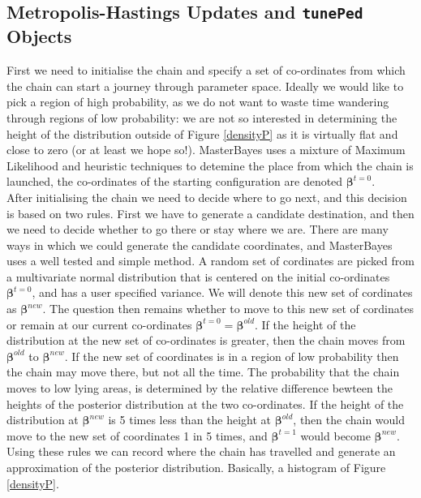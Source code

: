 \documentclass{article}
\begin{document}
\subsection{Metropolis-Hastings Updates and \texttt{tunePed} Objects}

First we need to initialise the chain and specify a set of co-ordinates from which the chain can start a journey through parameter space. Ideally we would like to pick a region of high probability, as we do not want to waste time wandering through regions of low probability: we are not so interested in determining the height of the distribution outside of  Figure \ref{densityP} as it is virtually flat and close to zero (or at least we hope so!).  MasterBayes uses a mixture of Maximum Likelihood and heuristic techniques to detemine the place from which the chain is launched, the co-ordinates of the starting configuration are denoted $\bm{\beta}^{t=0}$.\\

After initialising the chain we need to decide where to go next, and this decision is based on two rules.  First we have to generate a candidate destination, and then we need to decide whether to go there or stay where we are.  There are many ways in which we could generate the candidate coordinates, and MasterBayes uses a well tested and simple method. A random set of cordinates are picked from a multivariate normal distribution that is centered on the initial co-ordinates  $\bm{\beta}^{t=0}$, and has a user specified variance.  We will denote this new set of cordinates as $\bm{\beta}^{new}$. The question then remains whether to move to this new set of cordinates or remain at our current co-ordinates $\bm{\beta}^{t=0} = \bm{\beta}^{old}$.  If the height of the distribution at the new set of co-ordinates is greater, then the chain moves from $\bm{\beta}^{old}$ to $\bm{\beta}^{new}$. If the new set of coordinates is in a region of low probability then the chain may move there, but not all the time.  The probability that the chain moves to low lying areas, is determined by the relative difference bewteen the heights of the posterior distribution at the two co-ordinates.  If the height of the distribution at $\bm{\beta}^{new}$ is 5 times less than the height at $\bm{\beta}^{old}$, then the chain would move to the new set of coordinates 1 in 5 times, and $\bm{\beta}^{t=1}$ would become $\bm{\beta}^{new}$.  Using these rules we can record where the chain has travelled and generate an approximation of the posterior distribution.  Basically, a histogram of Figure \ref{densityP}.\\
\end{document}
